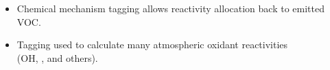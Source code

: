 \begin{BlueBox}
    \vskip-1cm
    \begin{block}{}
        \begin{itemize} 
            \item Chemical mechanism tagging \citep{Butler:2011} allows reactivity allocation back to emitted VOC. \vspace{11mm}
            \item Tagging used to calculate many atmospheric oxidant reactivities \\(OH, ,  and others).
        \end{itemize}
        \vskip3cm
        \begin{center}
            
        \end{center}
        \vskip8.5mm
    \end{block}
\end{BlueBox}
